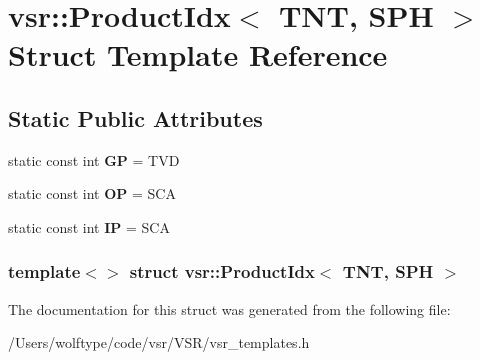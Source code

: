 \hypertarget{structvsr_1_1_product_idx_3_01_t_n_t_00_01_s_p_h_01_4}{\section{vsr\-:\-:Product\-Idx$<$ T\-N\-T, S\-P\-H $>$ Struct Template Reference}
\label{structvsr_1_1_product_idx_3_01_t_n_t_00_01_s_p_h_01_4}
}
\subsection*{Static Public Attributes}
\begin{DoxyCompactItemize}
\item 
\hypertarget{structvsr_1_1_product_idx_3_01_t_n_t_00_01_s_p_h_01_4_a102cf83f46f24061e0be61bdbf8cdd84}{static const int {\bfseries G\-P} = T\-V\-D}\label{structvsr_1_1_product_idx_3_01_t_n_t_00_01_s_p_h_01_4_a102cf83f46f24061e0be61bdbf8cdd84}

\item 
\hypertarget{structvsr_1_1_product_idx_3_01_t_n_t_00_01_s_p_h_01_4_a684a465bd74de0dc86afe17177914f81}{static const int {\bfseries O\-P} = S\-C\-A}\label{structvsr_1_1_product_idx_3_01_t_n_t_00_01_s_p_h_01_4_a684a465bd74de0dc86afe17177914f81}

\item 
\hypertarget{structvsr_1_1_product_idx_3_01_t_n_t_00_01_s_p_h_01_4_a5a35a98e1adca53e4d7ae56210d615ce}{static const int {\bfseries I\-P} = S\-C\-A}\label{structvsr_1_1_product_idx_3_01_t_n_t_00_01_s_p_h_01_4_a5a35a98e1adca53e4d7ae56210d615ce}

\end{DoxyCompactItemize}
\subsubsection*{template$<$$>$ struct vsr\-::\-Product\-Idx$<$ T\-N\-T, S\-P\-H $>$}



The documentation for this struct was generated from the following file\-:\begin{DoxyCompactItemize}
\item 
/\-Users/wolftype/code/vsr/\-V\-S\-R/vsr\-\_\-templates.\-h\end{DoxyCompactItemize}
